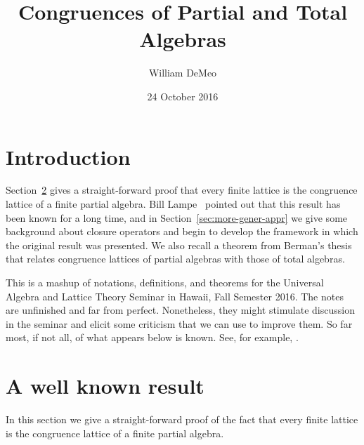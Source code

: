 
\usepackage{inputs/proof-dashed}



\usepackage{inputs/macros}

\usepackage[backend=bibtex]{biblatex}




\title[Congruences of Partial Algebras]{Congruences of Partial and Total Algebras}
\date{24 October 2016}
\author[W.~DeMeo]{William DeMeo}
\address{University of Hawaii}

\maketitle


\section{Introduction}
\label{sec:introduction}
Section~\ref{sec:simple-proof-well} gives a straight-forward proof that every finite
lattice is the congruence lattice of a finite partial algebra.
Bill Lampe~\cite{Lampe:20161017} pointed out
that this result has been known for a long time, and in
Section~\ref{sec:more-gener-appr}
we give some background about closure operators and 
begin to develop the framework in which the original result was presented.
We also recall a theorem from Berman's thesis that relates congruence lattices of
partial algebras with those of total algebras.

This is a mashup of notations, definitions, and theorems
for the Universal Algebra and Lattice Theory Seminar
in Hawaii, Fall Semester 2016. 
The notes are unfinished and far from perfect.
Nonetheless, they might stimulate discussion
in the seminar and elicit some criticism
that we can use to improve them.
So far most, if not all, of what appears below is known.
See, for example, \cite{MR2619731, MR0308011, MR0237401, MR2455216}.


\section{A well known result}
\label{sec:simple-proof-well}
In this section we give a straight-forward proof of the fact that every finite
lattice is the congruence lattice of a finite partial algebra.


